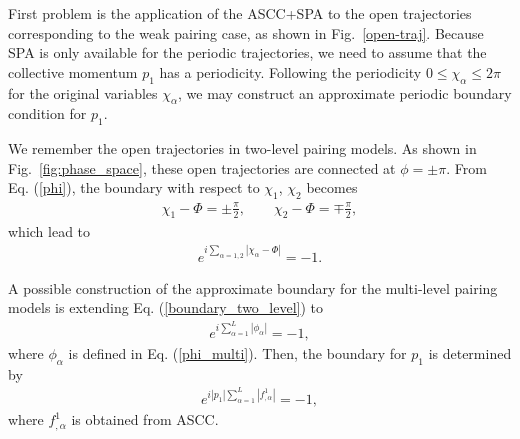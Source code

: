 \documentclass[11pt]{book} %
\begin{document}
First problem is the application of the ASCC+SPA to the open trajectories corresponding to the weak pairing case, as shown in Fig.~\ref{open-traj}. Because SPA is only available for the periodic trajectories, we need to assume that the collective momentum $p_1$ has a periodicity. Following the periodicity $0\le\chi_{\alpha}\le 2\pi$ for the original variables $\chi_{\alpha}$, we may construct an approximate periodic boundary condition for $p_1$.

We remember the open trajectories in two-level pairing models. As shown in Fig.~\ref{fig:phase_space}, these open trajectories are connected at $\phi=\pm\pi$. From Eq. (\ref{phi}), the boundary with respect to $\chi_1$, $\chi_2$ becomes
\begin{align}
  \chi_1 - \Phi = \pm \frac{\pi}{2}, \quad\quad \chi_2 - \Phi = \mp \frac{\pi}{2},
\end{align}
which lead to
\begin{align}
  e^{i\sum_{\alpha=1,2}|\chi_{\alpha} - \Phi|} = -1.
  \label{boundary_two_level}
\end{align}

A possible construction of the approximate boundary for the multi-level pairing models is extending Eq. (\ref{boundary_two_level}) to 
\begin{align}
  e^{i\sum_{\alpha=1}^{L}|\phi_{\alpha}|} = -1,
\end{align}
where $\phi_{\alpha}$ is defined in Eq. (\ref{phi_multi}). Then, the boundary for $p_1$ is determined by
\begin{align}
  e^{i|p_1|\sum_{\alpha=1}^{L}|f^1_{,\alpha}|} = -1,
  \label{boundary_multi}
\end{align}
where $f^1_{,\alpha}$ is obtained from ASCC.
\end{document}

